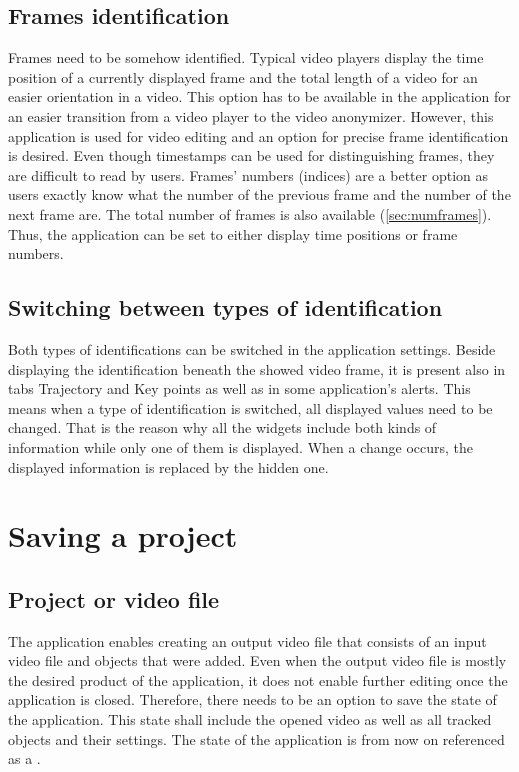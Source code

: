 \subsection{Frames identification}
Frames need to be somehow identified. Typical video players display the time position of a currently displayed frame and the total length of a video for an easier orientation in a video. This option has to be available in the application for an easier transition from a video player to the video anonymizer. However, this application is used for video editing and an option for precise frame identification is desired. Even though timestamps can be used for distinguishing frames, they are difficult to read by users. Frames' numbers (indices) are a better option as users exactly know what the number of the previous frame and the number of the next frame are. The total number of frames is also available (\autoref{sec:numframes}). Thus, the application can be set to either display time positions or frame numbers.

\subsection{Switching between types of identification}
Both types of identifications can be switched in the application settings. Beside displaying the identification beneath the showed video frame, it is present also in tabs Trajectory and Key points as well as in some application's alerts. This means when a type of identification is switched, all displayed values need to be changed. That is the reason why all the widgets include both kinds of information while only one of them is displayed. When a change occurs, the displayed information is replaced by the hidden one.

\section{Saving a project}\label{sec:save_project}
\subsection{Project or video file}
The application enables creating an output video file that consists of an input video file and objects that were added. Even when the output video file is mostly the desired product of the application, it does not enable further editing once the application is closed. Therefore, there needs to be an option to save the state of the application. This state shall include the opened video as well as all tracked objects and their settings. The state of the application is from now on referenced as a .


